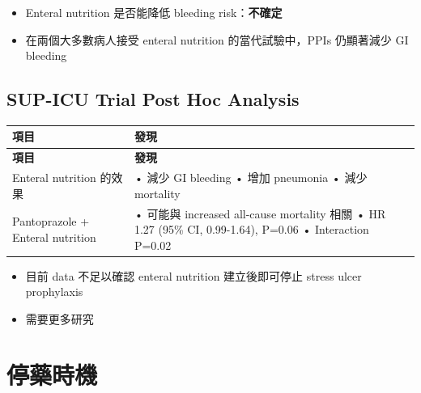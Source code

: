 \documentclass[12pt,a4paper]{article}
\begin{document}
\begin{itemize}
    \item Enteral nutrition 是否能降低 bleeding risk：\textbf{不確定}
    \item 在兩個大多數病人接受 enteral nutrition 的當代試驗中，PPIs 仍顯著減少 GI bleeding
\end{itemize}

\subsection{SUP-ICU Trial Post Hoc Analysis}

\begin{longtable}{p{5cm}p{9cm}}
\toprule
\textbf{項目} & \textbf{發現} \\
\midrule
\endfirsthead

\toprule
\textbf{項目} & \textbf{發現} \\
\midrule
\endhead

\bottomrule
\endfoot

Enteral nutrition 的效果 &
• 減少 GI bleeding\newline
• 增加 pneumonia\newline
• 減少 mortality \\
\midrule
Pantoprazole + Enteral nutrition &
• 可能與 increased all-cause mortality 相關\newline
• HR 1.27 (95\% CI, 0.99-1.64), P=0.06\newline
• Interaction P=0.02 \\
\bottomrule
\end{longtable}

\begin{itemize}
    \item 目前 data 不足以確認 enteral nutrition 建立後即可停止 stress ulcer prophylaxis
    \item 需要更多研究
\end{itemize}

\section{停藥時機}

\end{document}
